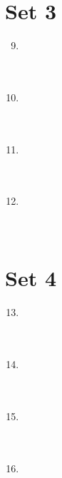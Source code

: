 \documentclass[11pt]{article}
\begin{document}
\eject

\section*{Set 3}

\begin{multicols*}{1} \begin{enumerate} 
\setcounter{enumi}{8}

\item \underline{\phantom{000000000000000}} \\ \\ \\
\item \underline{\phantom{000000000000000}} \\ \\ \\
\item \underline{\phantom{000000000000000}} \\ \\ \\
\item \underline{\phantom{000000000000000}} \\ \\ \\

\end{enumerate} \end{multicols*}

\eject

\section*{Set 4}

\begin{multicols*}{1} \begin{enumerate} 
\setcounter{enumi}{12}

\item \underline{\phantom{000000000000000}} \\ \\ \\
\item \underline{\phantom{000000000000000}} \\ \\ \\
\item \underline{\phantom{000000000000000}} \\ \\ \\
\item \underline{\phantom{000000000000000}} \\ \\ \\

\end{enumerate} \end{multicols*}
\end{document}
